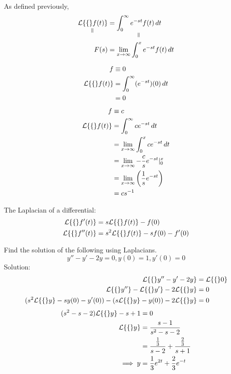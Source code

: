 \documentclass[diffeq.tex]{subfiles}
\begin{document}
    As defined previously,
    \begin{alignat*}{2} %
        \underset{\rotatebox{90}{$\,=$}}{\lp\{f(t)\}} &= \underset{\rotatebox{90}{$\,=$}}{\int_{0}^{\infty}e^{-st}f(t)\,dt}\\
        F(s) &= \lim_{x\to\infty}\int_{0}^{x}e^{-st}f(t)\,dt
    \end{alignat*}
    \begin{example}
        \begin{alignat}{1}
            f &\equiv 0\\
            \mathcal{L}\{\{\}f(t)\} &= \int_{0}^{\infty}(e^{-st})(0)\,dt\\
            &= 0
        \end{alignat}
        \begin{alignat}{1}
            f &\equiv c\\
            \mathcal{L}\{\{\}f(t)\} &= \int_{0}^{\infty}ce^{-st}\,dt\\
            &= \lim_{x\to\infty}\int_{0}^{x}ce^{-st}\,dt\\
            &= \lim_{x\to\infty}-\frac{c}{s}e^{-st}|_{0}^{x}\\
            &= \lim_{x\to\infty}\left(\frac{1}{s}e^{-st}\right)\\
            &= cs^{-1}
        \end{alignat}
    \end{example}
    \begin{btheorem}
        The Laplacian of a differential:
        \begin{alignat}{1}
            \mathcal{L}\{\{\}f'(t)\} &= s\mathcal{L}\{\{\}f(t)\} - f(0)\\
            \mathcal{L}\{\{\}f''(t)\} &= s^{2}\mathcal{L}\{\{\}f(t)\}-sf(0)-f'(0)
        \end{alignat}
    \end{btheorem}
    \begin{example}
        Find the solution of the following using Laplacians.
        \begin{equation}
            y'' - y' -2y = 0, y(0) = 1, y'(0) = 0
        \end{equation}
        Solution:
        \begin{alignat}{1}
            \mathcal{L}\{\{\}y'' - y' - 2y\} &= \mathcal{L}\{\{\}0\}\\
            \mathcal{L}\{\{\}y''\} - \mathcal{L}\{\{\}y'\} - 2\mathcal{L}\{\{\}y\} &= 0\\
            (s^{2}\mathcal{L}\{\{\}y\} - sy(0) - y'(0)) - (s\mathcal{L}\{\{\}y\} - y(0)) - 2\mathcal{L}\{\{\}y\} &= 0
        \end{alignat}
        \begin{alignat}{1}
            (s^{2} - s - 2)\mathcal{L}\{\{\}y\} - s + 1 &= 0\\
            \mathcal{L}\{\{\}y\} &= \frac{s - 1}{s^{2} - s - 2}\\
            &= \frac{\frac{1}{3}}{s-2} + \frac{\frac{2}{3}}{s+1}\\
            \implies y &= \frac{1}{3}e^{2t} + \frac{2}{3}e^{-t}
        \end{alignat}
    \end{example}
\end{document}
